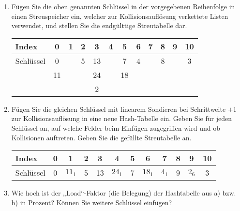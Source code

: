 \documentclass{lehramt-informatik}
\begin{document}
\begin{enumerate}


\item Fügen Sie die oben genannten Schlüssel in der vorgegebenen
Reihenfolge in einen Streuspeicher ein, welcher zur Kollisionsauflösung
verkettete Listen verwendet, und stellen Sie die endgülttige
Streutabelle dar.

\begin{antwort}
\begin{center}
\begin{tabular}{l|ccccccccccc}
Index     & 0  & 1 & 2 & 3  & 4 & 5  & 6 & 7 & 8 & 9 & 10\\\hline
Schlüssel & 0  &   & 5 & 13 &   & 7  & 4 &   & 8 &   & 3 \\
          & 11 &   &   & 24 &   & 18 &   &   &   &   &  \\
          &    &   &   & 2  &   &    &   &   &   &   &  \\
\end{tabular}
\end{center}
\end{antwort}


\item Fügen Sie die gleichen Schlüssel mit linearem Sondieren bei
Schrittweite $+1$ zur Kollisionsauflösung in eine neue Hash-Tabelle ein.
Geben Sie für jeden Schlüssel an, auf welche Felder beim Einfügen
zugegriffen wird und ob Kollisionen auftreten. Geben Sie die gefüllte
Streutabelle an.

\begin{antwort}
\begin{center}
\begin{tabular}{l|ccccccccccc}
Index     & 0  & 1      & 2 & 3  & 4       & 5  & 6      & 7      & 8 & 9      & 10\\\hline
Schlüssel & 0  & $11_1$ & 5 & 13 & $24_1$  & 7  & $18_1$ & $4_1$  & 9 & $2_6$  & 3 \\
\end{tabular}
\end{center}
\end{antwort}


\item Wie hoch ist der „Load“-Faktor (die Belegung) der Hashtabelle aus
a) bzw. b) in Prozent? Können Sie weitere Schlüssel einfügen?

\begin{antwort}


\end{antwort}
\end{enumerate}
\end{document}
